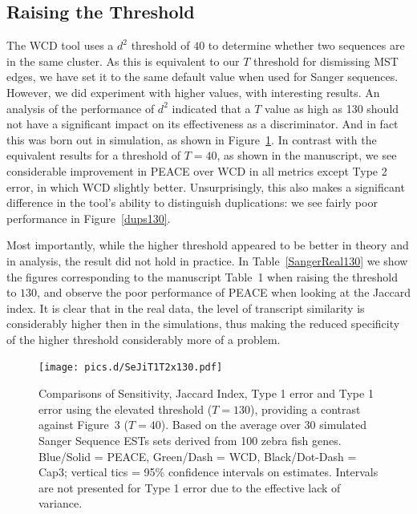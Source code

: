 \documentclass[a4paper,12pt]{article}
\newcommand{\mc}[1]{#1}   %
\newcommand{\peace} {{\small PEACE}}
\newcommand{\wcd} {{\small WCD}}
\newcommand{\capthree} {{\small Cap3}}
\begin{document}
\begin{appendix}
\subsection{Raising the Threshold}
\label{sim_thresh}
\mc{ 
  The \wcd\/ tool uses a $d^2$ threshold of $40$ to determine whether
  two sequences are in the same cluster.  As this is equivalent to our
  $T$ threshold for dismissing MST edges, we have set it to the same
  default value when used for Sanger} \mc{sequences.}  \mc{However,} \mc{we} \mc{did}
  \mc{experiment} \mc{with} \mc{higher} \mc{values,} \mc{with} \mc{interesting} \mc{results.  An
  analysis of the performance of $d^2$ indicated that a $T$ value as high as 130 should not have a
  significant impact on its effectiveness as a discriminator.  And in
  fact this was born out in simulation, as shown in
  Figure~\ref{SeJiT1T2130}.  In contrast with the equivalent results
  for a threshold of $T=40$, as shown in the manuscript, we see
  considerable improvement in \peace\/ over \wcd\/ in all metrics
  except Type 2 error, in which \wcd\/ slightly
  better. Unsurprisingly, this also makes a significant difference in
  the tool's ability to distinguish duplications: we see fairly poor
  performance in Figure~\ref{dups130}.  
}

\mc{ Most importantly, while the higher threshold appeared to be
  better in theory and in analysis, the result did not hold in
  practice.  In Table~\ref{SangerReal130} we show the figures
  corresponding to the manuscript Table~1 when raising the threshold
  to $130$, and observe the poor performance of \peace\/ when looking
  at the Jaccard index.  It is clear that in the real data, the level
  of transcript similarity is considerably higher then in the simulations, thus
  making the reduced specificity of the higher threshold considerably
  more of a problem.  }


\begin{figure}[tbh]
  \centerline{\texttt{[image: pics.d/SeJiT1T2x130.pdf]}}
  \caption{Comparisons of Sensitivity, Jaccard Index, Type 1 error and
    Type 1 error using the elevated threshold ($T=130$), providing a
    contrast against Figure~3 ($T=40$).  Based on the average over 30
    simulated Sanger Sequence ESTs sets derived from 100 zebra fish
    genes.  Blue/Solid = \peace, Green/Dash = \wcd, Black/Dot-Dash =
    \capthree; vertical tics = 95\% confidence intervals on estimates.
    Intervals are not presented for Type 1 error due to the effective
    lack of variance.}\label{SeJiT1T2130}
\end{figure}


\end{appendix}
\end{document}
